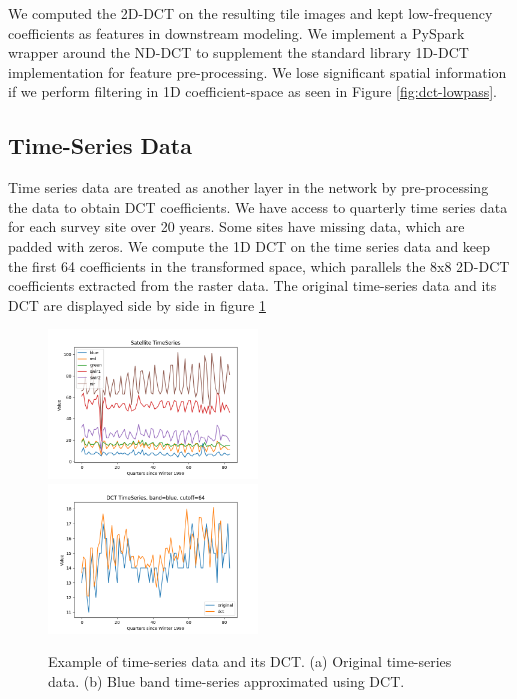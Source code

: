 We computed the 2D-DCT on the resulting tile images and kept low-frequency coefficients as features in downstream modeling. 
We implement a PySpark wrapper around the ND-DCT to supplement the standard library 1D-DCT implementation for feature pre-processing.
We lose significant spatial information if we perform filtering in 1D coefficient-space as seen in Figure \ref{fig:dct-lowpass}.

\subsection{Time-Series Data}

Time series data are treated as another layer in the network by pre-processing the data to obtain DCT coefficients.
We have access to quarterly time series data for each survey site over 20 years.
Some sites have missing data, which are padded with zeros.
We compute the 1D DCT on the time series data and keep the first 64 coefficients in the transformed space, which parallels the 8x8 2D-DCT coefficients extracted from the raster data.
The original time-series data and its DCT are displayed side by side in figure \ref{fig:dct-timeseries}

\begin{figure}[h!]
  \centering
  \includegraphics[width=0.495\textwidth]{figures/6-bands.png}
  \hfill
  \includegraphics[width=0.495\textwidth]{figures/both.png}
  \caption{
    Example of time-series data and its DCT.
    (a) Original time-series data.
    (b) Blue band time-series approximated using DCT.
  }
  \label{fig:dct-timeseries}
\end{figure}

